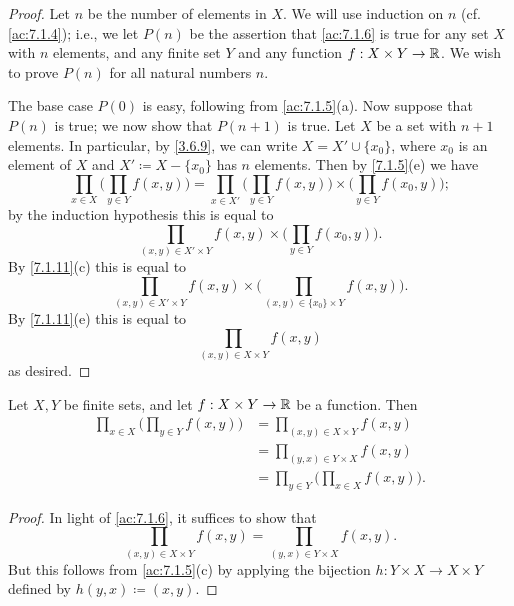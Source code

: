 \begin{proof}
  Let \(n\) be the number of elements in \(X\).
  We will use induction on \(n\) (cf. \cref{ac:7.1.4});
  i.e., we let \(P(n)\) be the assertion that \cref{ac:7.1.6} is true for any set \(X\) with \(n\) elements, and any finite set \(Y\) and any function \(f : X \times Y \to \mathbb{R}\).
  We wish to prove \(P(n)\) for all natural numbers \(n\).

  The base case \(P(0)\) is easy, following from \cref{ac:7.1.5}(a).
  Now suppose that \(P(n)\) is true;
  we now show that \(P(n + 1)\) is true.
  Let \(X\) be a set with \(n + 1\) elements.
  In particular, by \cref{3.6.9}, we can write \(X = X' \cup \{x_0\}\), where \(x_0\) is an element of \(X\) and \(X' \coloneqq X - \{x_0\}\) has \(n\) elements.
  Then by \cref{7.1.5}(e) we have
  \[
    \prod_{x \in X} \bigg(\prod_{y \in Y} f(x, y)\bigg) = \prod_{x \in X'} \bigg(\prod_{y \in Y} f(x, y)\bigg) \times \bigg(\prod_{y \in Y} f(x_0, y)\bigg);
  \]
  by the induction hypothesis this is equal to
  \[
    \prod_{(x, y) \in X' \times Y} f(x, y) \times \bigg(\prod_{y \in Y} f(x_0, y)\bigg).
  \]
  By \cref{7.1.11}(c) this is equal to
  \[
    \prod_{(x, y) \in X' \times Y} f(x, y) \times \bigg(\prod_{(x, y) \in \{x_0\} \times Y} f(x, y)\bigg).
  \]
  By \cref{7.1.11}(e) this is equal to
  \[
    \prod_{(x, y) \in X \times Y} f(x, y)
  \]
  as desired.
\end{proof}

\begin{ac}\label{ac:7.1.7}
  Let \(X, Y\) be finite sets, and let \(f : X \times Y \to \mathbb{R}\) be a function.
  Then
  \begin{align*}
    \prod_{x \in X} \bigg(\prod_{y \in Y} f(x, y)\bigg) & = \prod_{(x, y) \in X \times Y} f(x, y)                \\
                                                        & = \prod_{(y, x) \in Y \times X} f(x, y)                \\
                                                        & = \prod_{y \in Y} \bigg(\prod_{x \in X} f(x, y)\bigg).
  \end{align*}
\end{ac}

\begin{proof}
  In light of \cref{ac:7.1.6}, it suffices to show that
  \[
    \prod_{(x, y) \in X \times Y} f(x, y) = \prod_{(y, x) \in Y \times X} f(x, y).
  \]
  But this follows from \cref{ac:7.1.5}(c) by applying the bijection \(h : Y \times X \to X \times Y\) defined by \(h(y, x) \coloneqq (x, y)\).
\end{proof}


